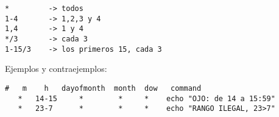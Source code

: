 \documentclass[ucs]{beamer}
\begin{document}
%

\begin{frame}[fragile]
\begin{small}
\begin{verbatim}
*         -> todos            
1-4       -> 1,2,3 y 4    
1,4       -> 1 y 4 
*/3       -> cada 3 
1-15/3    -> los primeros 15, cada 3 
\end{verbatim}

Ejemplos y contraejemplos:

\begin{scriptsize}
\begin{verbatim}
#   m    h   dayofmonth  month  dow   command
   *   14-15     *        *     *    echo "OJO: de 14 a 15:59"
   *   23-7      *        *     *    echo "RANGO ILEGAL, 23>7"
\end{verbatim}
\end{scriptsize}


\end{small}
\end{frame}
\end{document}

